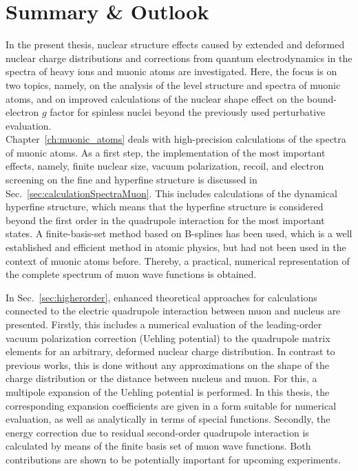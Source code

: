 \chapter*{Summary \& Outlook}
\label{ch:conclusion}

In the present thesis, nuclear structure effects caused by extended and deformed nuclear charge distributions and corrections from quantum electrodynamics in the spectra of heavy ions and muonic atoms are investigated. 
Here, the focus is on two topics, namely, on the analysis of the level structure and spectra of muonic atoms, and on improved calculations of the nuclear shape effect on the bound-electron $g$ factor for spinless nuclei beyond the previously used perturbative evaluation.\\[11pt]%
%
Chapter~\ref{ch:muonic_atoms} deals with high-precision calculations of the spectra of muonic atoms. 
As a first step, the implementation of the most important effects, namely, finite nuclear size, vacuum polarization, recoil, and electron screening on the fine and hyperfine structure is discussed in Sec.~\ref{sec:calculationSpectraMuon}.
This includes calculations of the dynamical hyperfine structure, which means that the hyperfine structure is considered beyond the first order in the quadrupole interaction for the most important states.
A finite-basis-set method based on B-splines has been used, which is a well established and efficient method in atomic physics, but had not been used in the context of muonic atoms before. Thereby, a practical, numerical representation of the complete spectrum of muon wave functions is obtained.

In Sec.~\ref{sec:higherorder}, enhanced theoretical approaches for calculations connected to the electric quadrupole interaction between muon and nucleus are presented. 
Firstly, this includes a numerical evaluation of the leading-order vacuum polarization correction (Uehling potential) to the quadrupole matrix elements for an arbitrary, deformed nuclear charge distribution. In contrast to previous works, this is done without any approximations on the shape of the charge distribution or the distance between nucleus and muon. For this, a multipole expansion of the Uehling potential is performed. In this thesis, the corresponding expansion coefficients are given in a form suitable for numerical evaluation, as well as analytically in terms of special functions.
Secondly, the energy correction due to residual second-order quadrupole interaction is calculated by means of the finite basis set of muon wave functions.
Both contributions are shown to be potentially important for upcoming experiments.

